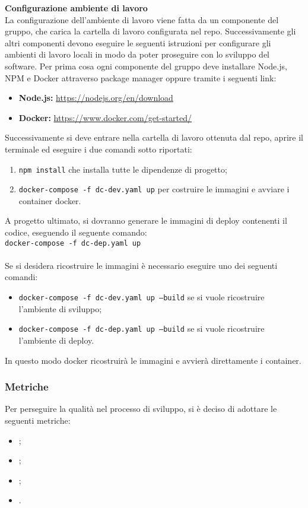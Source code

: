 \noindent \textbf{Configurazione ambiente di lavoro} \\
La configurazione dell’ambiente di lavoro viene fatta da un componente del gruppo, che carica la cartella
di lavoro configurata nel repo. Successivamente gli altri componenti devono eseguire le seguenti istruzioni
per configurare gli ambienti di lavoro locali in modo da poter proseguire con lo sviluppo del software. 
Per prima cosa ogni componente del gruppo deve installare Node.js, NPM e Docker
attraverso package manager oppure tramite i seguenti link:
\begin{itemize}
    \item \textbf{Node.js:} \url{https://nodejs.org/en/download}
    \item \textbf{Docker:} \url{https://www.docker.com/get-started/}
\end{itemize}
Successivamente si deve entrare nella cartella di lavoro ottenuta dal repo, aprire il terminale ed eseguire i due comandi sotto riportati:
\begin{enumerate}
    \item \texttt{npm install} che installa tutte le dipendenze di progetto;
    \item \texttt{docker-compose -f dc-dev.yaml up} per costruire le immagini e avviare i container docker.
\end{enumerate}
A progetto ultimato, si dovranno generare le immagini di deploy contenenti il codice, eseguendo il seguente comando:\\
\indent \texttt{docker-compose -f dc-dep.yaml up}\\\\
Se si desidera ricostruire le immagini è necessario eseguire uno dei seguenti comandi:
\begin{itemize}
    \item \texttt{docker-compose -f dc-dev.yaml up --build} se si vuole ricostruire l'ambiente di sviluppo;
    \item \texttt{docker-compose -f dc-dep.yaml up --build} se si vuole ricostruire l'ambiente di deploy.
\end{itemize}
In questo modo docker ricostruirà le immagini e avvierà direttamente i container.


\subsubsection{Metriche}
Per perseguire la qualità nel processo di sviluppo, si è deciso di adottare le
seguenti metriche:
\begin{itemize}
    \item {};
    \item {};
    \item {};
    \item {}.
\end{itemize}

